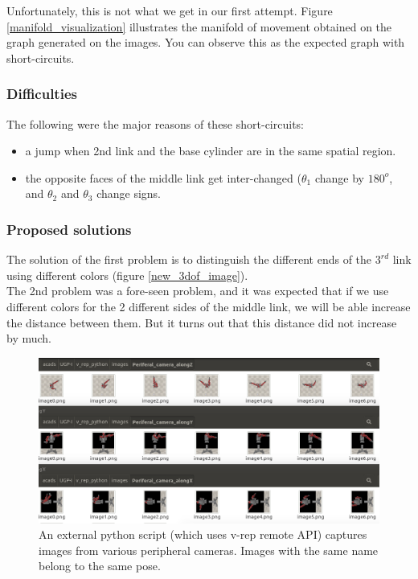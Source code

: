 \documentclass[12pt, two column]{article}
\begin{document}
  Unfortunately, this is not what we get in our first attempt. Figure \ref{manifold_visualization} illustrates the manifold of movement obtained on the graph generated on the images. You can observe this as the expected graph with short-circuits.

\subsubsection{Difficulties}
  The following were the major reasons of these short-circuits:
  \begin{itemize}
    \item a jump when 2nd link and the base cylinder are in the same spatial region.
    \item the opposite faces of the middle link get inter-changed ($\theta_1$ change by $180^o$, and $\theta_2$ and $\theta_3$ change signs.
  \end{itemize}

\subsubsection{Proposed solutions}
  The solution of the first problem is to distinguish the different ends of the $3^{rd}$ link using different colors (figure \ref{new_3dof_image}).\\
  The 2nd problem was a fore-seen problem, and it was expected that if we use different colors for the 2 different sides of the middle link, we will be able increase the distance between them. But it turns out that this distance did not increase by much.

\begin{figure}
  \includegraphics[width=\columnwidth]{graphics/Baxter}
  \caption{An external python script (which uses v-rep remote API) captures images from various peripheral cameras. Images with the same name belong to the same pose.}
  \label{Baxter}
\end{figure}
\end{document}
